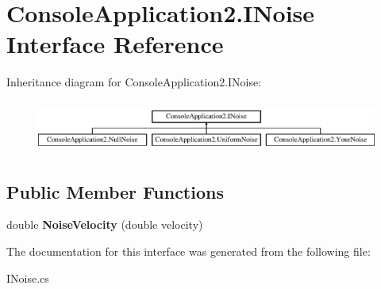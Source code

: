 \hypertarget{interface_console_application2_1_1_i_noise}{}\section{Console\+Application2.\+I\+Noise Interface Reference}
\label{interface_console_application2_1_1_i_noise}
Inheritance diagram for Console\+Application2.\+I\+Noise\+:\begin{figure}[H]
\begin{center}
\leavevmode
\includegraphics[height=1.736434cm]{interface_console_application2_1_1_i_noise}
\end{center}
\end{figure}
\subsection*{Public Member Functions}
\begin{DoxyCompactItemize}
\item 
\hypertarget{interface_console_application2_1_1_i_noise_a98491fa7488c3c88bd27b1d71c15b014}{}double {\bfseries Noise\+Velocity} (double velocity)\label{interface_console_application2_1_1_i_noise_a98491fa7488c3c88bd27b1d71c15b014}

\end{DoxyCompactItemize}


The documentation for this interface was generated from the following file\+:\begin{DoxyCompactItemize}
\item 
I\+Noise.\+cs\end{DoxyCompactItemize}
